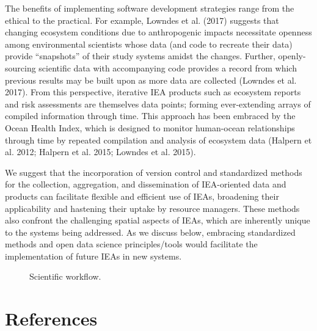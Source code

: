 \documentclass[
]{article}
\begin{document}
The benefits of implementing software development strategies range from
the ethical to the practical. For example, Lowndes et al. (2017)
suggests that changing ecosystem conditions due to anthropogenic impacts
necessitate openness among environmental scientists whose data (and code
to recreate their data) provide ``snapshots'' of their study systems
amidst the changes. Further, openly-sourcing scientific data with
accompanying code provides a record from which previous results may be
built upon as more data are collected (Lowndes et al. 2017). From this
perspective, iterative IEA products such as ecosystem reports and risk
assessments are themselves data points; forming ever-extending arrays of
compiled information through time. This approach has been embraced by
the Ocean Health Index, which is designed to monitor human-ocean
relationships through time by repeated compilation and analysis of
ecosystem data (Halpern et al. 2012; Halpern et al. 2015; Lowndes et al.
2015).

We suggest that the incorporation of version control and standardized
methods for the collection, aggregation, and dissemination of
IEA-oriented data and products can facilitate flexible and efficient use
of IEAs, broadening their applicability and hastening their uptake by
resource managers. These methods also confront the challenging spatial
aspects of IEAs, which are inherently unique to the systems being
addressed. As we discuss below, embracing standardized methods and open
data science principles/tools would facilitate the implementation of
future IEAs in new systems.

\begin{figure}
  \centering
  \caption{Scientific workflow.}
\end{figure}

\hypertarget{references}{%
\section{References}\label{references}}
\end{document}
